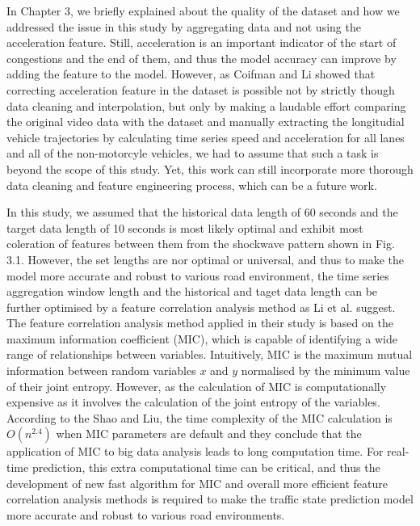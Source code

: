 \documentclass[11pt]{uonthesis}
\begin{document}
In Chapter 3, we briefly explained about the quality of the dataset and how we addressed the issue in this study by aggregating data and not using the acceleration feature. Still, acceleration is an important indicator of the start of congestions and the end of them, and thus the model accuracy can improve by adding the feature to the model. However, as Coifman and Li\cite{COIFMAN2017362} showed that correcting acceleration feature in the dataset is possible not by strictly though data cleaning and interpolation, but only by making a laudable effort comparing the original video data with the dataset and manually extracting the longitudial vehicle trajectories by calculating time series speed and acceleration for all lanes and all of the non-motorcyle vehicles, we had to assume that such a task is beyond the scope of this study. Yet, this work can still incorporate more thorough data cleaning and feature engineering process, which can be a future work.

In this study, we assumed that the historical data length of 60 seconds and the target data length of 10 seconds is most likely optimal and exhibit most coleration of features between them from the shockwave pattern shown in Fig. 3.1. %
However, the set lengths are nor optimal or universal, and thus to make the model more accurate and robust to various road environment, the time series aggregation window length and the historical and taget data length can be further optimised by a feature correlation analysis method as Li et al.\cite{9284587} suggest. The feature correlation analysis method applied in their study is based on the maximum information coefficient (MIC), which is capable of identifying a wide range of relationships between variables\cite{mic}. %
Intuitively, MIC is the maximum mutual information between random variables $x$ and $y$ normalised by the minimum value of their joint entropy. However, as the calculation of MIC is computationally expensive as it involves the calculation of the joint entropy of the variables. According to the Shao and Liu\cite{miccomplexity}, the time complexity of the MIC calculation is $O(n^{2.4})$ when MIC parameters are default and they conclude that the application of MIC to big data analysis leads to long computation time. For real-time prediction, this extra computational time can be critical, and thus the development of new fast algorithm for MIC and overall more efficient feature correlation analysis methods is required to make the traffic state prediction model more accurate and robust to various road environments.
\end{document}
